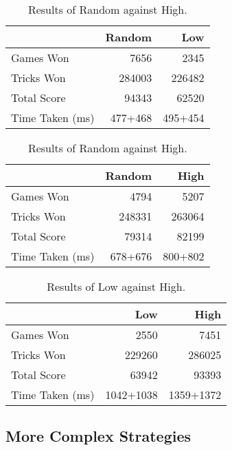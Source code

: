 \begin{table}[ht]
    \begin{minipage}{.5\linewidth}
        \centering
        \begin{tabular}{l|rr}
            ~               &   Random  &   Low     \\  \hline
            Games Won       &   7656   &   2345   \\
            Tricks Won      &   284003 &   226482 \\
            Total Score     &   94343  &   62520  \\
            Time Taken (ms) &   477+468     &   495+454
        \end{tabular}
        \caption{Results of Random against Low.}
        \label{tab:random_low}
    \end{minipage}%
    \begin{minipage}{.5\linewidth}
        \centering
        \begin{tabular}{l|rr}
            ~               &   Random  &   High    \\  \hline
            Games Won       &   4794   &   5207   \\
            Tricks Won      &   248331 &   263064 \\
            Total Score     &   79314  &   82199  \\
            Time Taken (ms) &   678+676   &   800+802
        \end{tabular}
        \caption{Results of Random against High.}
        \label{tab:random_high}
    \end{minipage} 
\end{table}

\begin{table}[ht]
    \centering
    \begin{tabular}{l|rr}
        ~               &   Low     &   High    \\  \hline
        Games Won       &   2550   &   7451   \\
        Tricks Won      &   229260 &   286025 \\
        Total Score     &   63942  &   93393  \\
        Time Taken (ms) &   1042+1038   &   1359+1372
    \end{tabular}
    \caption{Results of Low against High.}
    \label{tab:low_high}
\end{table}


\subsection{More Complex Strategies}

